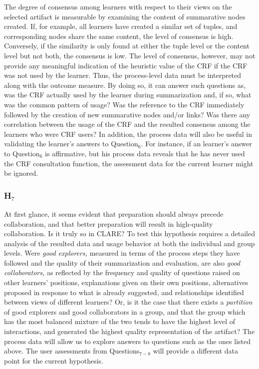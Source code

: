 The degree of consensus among learners with respect to their views on the
selected artifact is measurable by examining the content of summarative
nodes created. If, for example, all learners have created a similar set of
tuples, and corresponding nodes share the same content, the level of
consensus is high. Conversely, if the similarity is only found at either
the tuple level or the content level but not both, the consensus is low.
The level of consensus, however, may not provide any meaningful indication
of the heuristic value of the CRF if the CRF was not used by the learner.
Thus, the process-level data must be interpreted along with the outcome
measure. By doing so, it can answer such questions as, was the CRF actually
used by the learner during summarization and, if so, what was the common
pattern of usage? Was the reference to the CRF immediately followed by the
creation of new summarative nodes and/or links? Was there any correlation
between the usage of the CRF and the resulted consensus among the learners
who were CRF users?  In addition, the process data will also be useful in
validating the learner's answers to Question\(_{6}\). For instance, if an
learner's answer to Question\(_6\) is affirmative, but his process data
reveals that he has never used the CRF consultation function, the
assessment data for the current learner might be ignored.


\subsubsection{H\(_7\)}
\label{sec:SECAI1 data}

At first glance, it seems evident that preparation should always precede
collaboration, and that better preparation will result in high-quality
collaboration. Is it truly so in CLARE? To test this hypothesis requires a
detailed analysis of the resulted data and usage behavior at both the
individual and group levels. Were {\it good explorers,\/} measured in terms
of the process steps they have followed and the quality of their
summarization and evaluation, are also {\it good collaborators,\/} as
reflected by the frequency and quality of questions raised on other
learners' positions, explanations given on their own positions,
alternatives proposed in response to what is already suggested, and
relationships identified between views of different learners?  Or, is it
the case that there exists a {\it partition\/} of good explorers and good
collaborators in a group, and that the group which has the most balanced
mixture of the two tends to have the highest level of interactions, and
generated the highest quality representation of the artifact? The process
data will allow us to explore answers to questions such as the ones listed
above. The user assessments from Questions\(_{7-8}\) will provide a
different data point for the current hypothesis.


